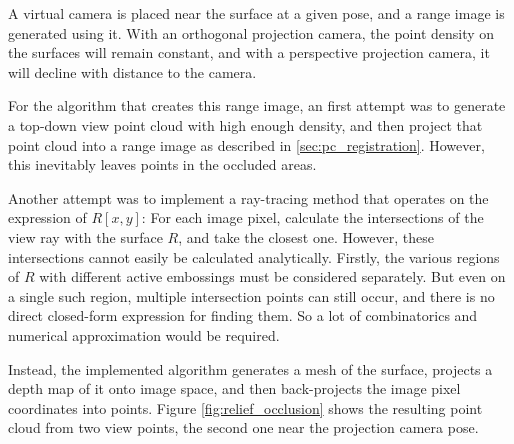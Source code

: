 A virtual camera is placed near the surface at a given pose, and a range image is generated using it. With an orthogonal projection camera, the point density on the surfaces will remain constant, and with a perspective projection camera, it will decline with distance to the camera.

For the algorithm that creates this range image, an first attempt was to generate a top-down view point cloud with high enough density, and then project that point cloud into a range image as described in \ref{sec:pc_registration}. However, this inevitably leaves points in the occluded areas.

Another attempt was to implement a ray-tracing method that operates on the expression of $R[x,y]$: For each image pixel, calculate the intersections of the view ray with the surface $R$, and take the closest one. However, these intersections cannot easily be calculated analytically. Firstly, the various regions of $R$ with different active embossings must be considered separately. But even on a single such region, multiple intersection points can still occur, and there is no direct closed-form expression for finding them. So a lot of combinatorics and numerical approximation would be required.

Instead, the implemented algorithm generates a mesh of the surface, projects a depth map of it onto image space, and then back-projects the image pixel coordinates into points. Figure \ref{fig:relief_occlusion} shows the resulting point cloud from two view points, the second one near the projection camera pose.

